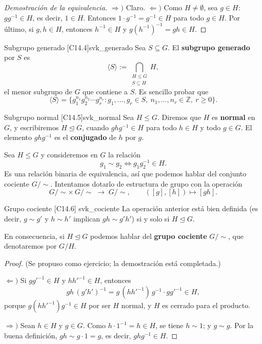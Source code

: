 \begin{proof}[Demostración de la equivalencia]
$\Rightarrow)$ Claro. $\Leftarrow)$ Como $H \neq \emptyset$, sea $g \in H$: $gg^{-1} \in H$, es decir, $1 \in H$. Entonces $1 \cdot g^{-1} = g^{-1} \in H$ para todo $g \in H$. Por último, si $g, h \in H$, entonces $h^{-1} \in H$ y $g (h^{-1})^{-1} = gh \in H$.
\end{proof}

\begin{definicion}{Subgrupo generado [C14.4]}{svk_generado}
Sea $S \subseteq G$. El \textbf{subgrupo generado} por $S$ es
\[ \langle S \rangle := \bigcap_{\substack{H \leq G \\ S \subseteq H}} H, \]
el menor subgrupo de $G$ que contiene a $S$. Es sencillo probar que
\[ \langle S \rangle = \{ g_1^{n_1} g_2^{n_2} \cdots g_r^{n_r} : g_1, \dots, g_r \in S,\ n_1, \dots, n_r \in \mathbb{Z},\ r \geq 0 \}. \]
\end{definicion}

\begin{definicion}{Subgrupo normal [C14.5]}{svk_normal}
Sea $H \leq G$. Diremos que $H$ es \textbf{normal} en $G$, y escribiremos $H \trianglelefteq G$, cuando $ghg^{-1} \in H$ para todo $h \in H$ y todo $g \in G$. El elemento $ghg^{-1}$ es el \textbf{conjugado} de $h$ por $g$.
\end{definicion}

Sea $H \leq G$ y consideremos en $G$ la relación
\[ g_1 \sim g_2 \iff g_1 g_2^{-1} \in H. \]
Es una relación binaria de equivalencia, así que podemos hablar del conjunto cociente $G/\!\sim$. Intentamos dotarlo de estructura de grupo con la operación
\[ G/\!\sim \times\, G/\!\sim \;\longrightarrow\; G/\!\sim, \qquad ([g],[h]) \longmapsto [gh]. \]

\begin{teorema}{Grupo cociente [C14.6] \marcaE}{svk_cociente}
La operación anterior está bien definida (es decir, $g \sim g'$ y $h \sim h'$ implican $gh \sim g'h'$) si y solo si $H \trianglelefteq G$.

En consecuencia, si $H \trianglelefteq G$ podemos hablar del \textbf{grupo cociente} $G/\!\sim$, que denotaremos por $G/H$.
\end{teorema}

\begin{proof}
(Se propuso como ejercicio; la demostración está completada.)

$\Leftarrow)$ Si $g g'^{-1} \in H$ y $h h'^{-1} \in H$, entonces
\[ gh\,(g'h')^{-1} = g\,(h h'^{-1})\,g^{-1} \cdot g g'^{-1} \in H, \]
porque $g (hh'^{-1}) g^{-1} \in H$ por ser $H$ normal, y $H$ es cerrado para el producto.

$\Rightarrow)$ Sean $h \in H$ y $g \in G$. Como $h \cdot 1^{-1} = h \in H$, se tiene $h \sim 1$; y $g \sim g$. Por la buena definición, $gh \sim g \cdot 1 = g$, es decir, $gh g^{-1} \in H$.
\end{proof}

